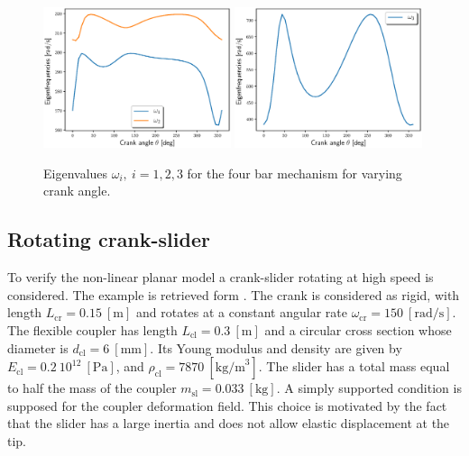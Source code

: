 \documentclass{svjour3}                     %
\begin{document}
\begin{figure}[tb]
	\centering
	\includegraphics[width=0.49\textwidth]{FourBar_Om12.eps} 
	\includegraphics[width=0.49\textwidth]{FourBar_Om3.eps} 
	\caption{Eigenvalues $\omega_i, \ i=1,2,3$ for the four bar mechanism for varying crank angle.}
	\label{fig:omega_4bars}
\end{figure}

\subsection{Rotating crank-slider}
To verify the non-linear planar model a crank-slider rotating at high speed is considered. The example is retrieved form \cite{Ellenbroek2018}.  The crank is considered as rigid, with length $L_{\text{cr}} = 0.15 \ [\mathrm{m}]$ and rotates at a constant angular rate $\omega_{\text{cr}} = 150 \ [\mathrm{rad/s}]$. The flexible coupler has length $L_{\text{cl}} = 0.3 \ [\mathrm{m}]$ and a circular cross section whose diameter is $d_{\text{cl}} = 6 \ [\mathrm{mm}]$. Its Young modulus and density are given by $E_{\text{cl}}=0.2 \ 10^{12} \ [\mathrm{Pa}]$, and $\rho_{\text{cl}}=7870 \ [\mathrm{kg/m}^3]$. The slider has a total mass equal to half the mass of the coupler $m_{\text{sl}} = 0.033 \ [\mathrm{kg}]$. A simply supported condition is supposed for the coupler deformation field. This choice is motivated by the fact that the slider has a large inertia and does not allow elastic displacement at the tip.
\end{document}
